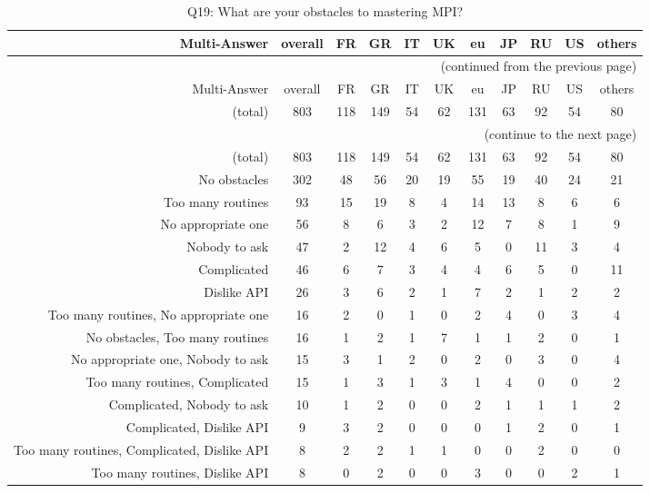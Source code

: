 \clearpage%
{\footnotesize\begin{landscape}%
\begin{longtable}[htb]{r|c|c|c|c|c|c|c|c|c|c}%
\caption{Q19: What are your obstacles to mastering MPI?}%
\label{tab:Q19-mans} \\%
\hline%
Multi-Answer & overall & FR & GR & IT & UK & eu & JP & RU & US & others \\
 \hline%
\endfirsthead%
\multicolumn{11}{r}{(continued from the previous page)}\\%
\hline%
Multi-Answer & overall & FR & GR & IT & UK & eu & JP & RU & US & others \\
 \hline%
\endhead%
\hline%
(total) & 803 & 118 & 149 & 54 & 62 & 131 & 63 & 92 & 54 & 80 \\%
\hline%
\multicolumn{11}{r}{(continue to the next page)}\\%
\endfoot%
\hline%
(total) & 803 & 118 & 149 & 54 & 62 & 131 & 63 & 92 & 54 & 80 \\%
\hline%
\endlastfoot%
\hline%
{No obstacles} & 302 & 48 & 56 & 20 & 19 & 55 & 19 & 40 & 24 & 21 \\%
{Too many routines} & 93 & 15 & 19 & 8 & 4 & 14 & 13 & 8 & 6 & 6 \\%
{No appropriate one} & 56 & 8 & 6 & 3 & 2 & 12 & 7 & 8 & 1 & 9 \\%
{Nobody to ask} & 47 & 2 & 12 & 4 & 6 & 5 & 0 & 11 & 3 & 4 \\%
{Complicated} & 46 & 6 & 7 & 3 & 4 & 4 & 6 & 5 & 0 & 11 \\%
{Dislike API} & 26 & 3 & 6 & 2 & 1 & 7 & 2 & 1 & 2 & 2 \\%
{Too many routines, No appropriate one} & 16 & 2 & 0 & 1 & 0 & 2 & 4 & 0 & 3 & 4 \\%
{No obstacles, Too many routines} & 16 & 1 & 2 & 1 & 7 & 1 & 1 & 2 & 0 & 1 \\%
{No appropriate one, Nobody to ask} & 15 & 3 & 1 & 2 & 0 & 2 & 0 & 3 & 0 & 4 \\%
{Too many routines, Complicated} & 15 & 1 & 3 & 1 & 3 & 1 & 4 & 0 & 0 & 2 \\%
{Complicated, Nobody to ask} & 10 & 1 & 2 & 0 & 0 & 2 & 1 & 1 & 1 & 2 \\%
{Complicated, Dislike API} & 9 & 3 & 2 & 0 & 0 & 0 & 1 & 2 & 0 & 1 \\%
{Too many routines, Complicated, Dislike API} & 8 & 2 & 2 & 1 & 1 & 0 & 0 & 2 & 0 & 0 \\%
{Too many routines, Dislike API} & 8 & 0 & 2 & 0 & 0 & 3 & 0 & 0 & 2 & 1 \\%

\end{longtable}
\end{landscape}}
